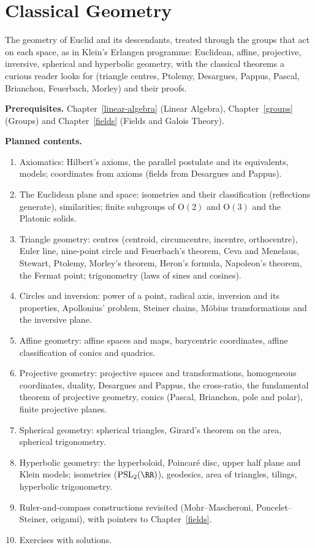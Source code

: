 \chapter{Classical Geometry}\label{classical-geometry}

The geometry of Euclid and its descendants, treated through the groups that act on each space, as in Klein's Erlangen programme: Euclidean, affine, projective, inversive, spherical and hyperbolic
geometry, with the classical theorems a curious reader looks for (triangle centres, Ptolemy, Desargues, Pappus, Pascal, Brianchon, Feuerbach, Morley) and their proofs.

\noindent\textbf{Prerequisites.} Chapter~\ref{linear-algebra} (Linear Algebra), Chapter~\ref{groups} (Groups) and Chapter~\ref{fields} (Fields and Galois Theory).

\noindent\textbf{Planned contents.}
\begin{enumerate}
\item Axiomatics: Hilbert's axioms, the parallel postulate and its equivalents, models; coordinates from axioms (fields from Desargues and Pappus).
\item The Euclidean plane and space: isometries and their classification (reflections generate), similarities; finite subgroups of $\mathrm{O}(2)$ and $\mathrm{O}(3)$ and the Platonic solids.
\item Triangle geometry: centres (centroid, circumcentre, incentre, orthocentre), Euler line, nine-point circle and Feuerbach's theorem, Ceva and Menelaus, Stewart, Ptolemy, Morley's theorem, Heron's
formula, Napoleon's theorem, the Fermat point; trigonometry (laws of sines and cosines).
\item Circles and inversion: power of a point, radical axis, inversion and its properties, Apollonius' problem, Steiner chains, Möbius transformations and the inversive plane.
\item Affine geometry: affine spaces and maps, barycentric coordinates, affine classification of conics and quadrics.
\item Projective geometry: projective spaces and transformations, homogeneous coordinates, duality, Desargues and Pappus, the cross-ratio, the fundamental theorem of projective geometry, conics
(Pascal, Brianchon, pole and polar), finite projective planes.
\item Spherical geometry: spherical triangles, Girard's theorem on the area, spherical trigonometry.
\item Hyperbolic geometry: the hyperboloid, Poincaré disc, upper half plane and Klein models; isometries ($\mathrm{PSL}_2(\RR)$), geodesics, area of triangles, tilings, hyperbolic trigonometry.
\item Ruler-and-compass constructions revisited (Mohr--Mascheroni, Poncelet--Steiner, origami), with pointers to Chapter~\ref{fields}.
\item Exercises with solutions.
\end{enumerate}
